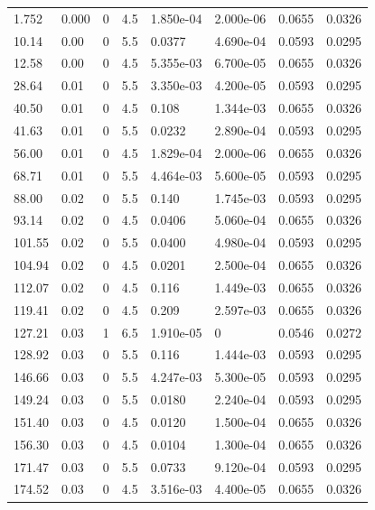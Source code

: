 \documentclass[preview]{standalone}
\begin{document}
{{\begin{tabular}{L{1.2cm}C{1.2cm} C{0.3cm}C{0.5cm} C{1.4cm}C{1.4cm} C{1.4cm}C{1.4cm}}
  1.752  &  0.000  & 0     & 4.5 &  1.850e-04  & 2.000e-06  & 0.0655 &  0.0326   \\ 
  10.14  &  0.00  & 0     & 5.5 &  0.0377  & 4.690e-04  & 0.0593 &  0.0295   \\ 
  12.58  &  0.00  & 0     & 4.5 &  5.355e-03  & 6.700e-05  & 0.0655 &  0.0326   \\ 
  28.64  &  0.01  & 0     & 5.5 &  3.350e-03  & 4.200e-05  & 0.0593 &  0.0295   \\ 
  40.50  &  0.01  & 0     & 4.5 &  0.108  & 1.344e-03  & 0.0655 &  0.0326   \\ 
  41.63  &  0.01  & 0     & 5.5 &  0.0232  & 2.890e-04  & 0.0593 &  0.0295   \\ 
  56.00  &  0.01  & 0     & 4.5 &  1.829e-04  & 2.000e-06  & 0.0655 &  0.0326   \\ 
  68.71  &  0.01  & 0     & 5.5 &  4.464e-03  & 5.600e-05  & 0.0593 &  0.0295   \\ 
  88.00  &  0.02  & 0     & 5.5 &  0.140  & 1.745e-03  & 0.0593 &  0.0295   \\ 
  93.14  &  0.02  & 0     & 4.5 &  0.0406  & 5.060e-04  & 0.0655 &  0.0326   \\ 
  101.55  &  0.02  & 0     & 5.5 &  0.0400  & 4.980e-04  & 0.0593 &  0.0295   \\ 
  104.94  &  0.02  & 0     & 4.5 &  0.0201  & 2.500e-04  & 0.0655 &  0.0326   \\ 
  112.07  &  0.02  & 0     & 4.5 &  0.116  & 1.449e-03  & 0.0655 &  0.0326   \\ 
  119.41  &  0.02  & 0     & 4.5 &  0.209  & 2.597e-03  & 0.0655 &  0.0326   \\ 
  127.21  &  0.03  & 1     & 6.5 &  1.910e-05  & 0  & 0.0546 &  0.0272   \\ 
  128.92  &  0.03  & 0     & 5.5 &  0.116  & 1.444e-03  & 0.0593 &  0.0295   \\ 
  146.66  &  0.03  & 0     & 5.5 &  4.247e-03  & 5.300e-05  & 0.0593 &  0.0295   \\ 
  149.24  &  0.03  & 0     & 5.5 &  0.0180  & 2.240e-04  & 0.0593 &  0.0295   \\ 
  151.40  &  0.03  & 0     & 4.5 &  0.0120  & 1.500e-04  & 0.0655 &  0.0326   \\ 
  156.30  &  0.03  & 0     & 4.5 &  0.0104  & 1.300e-04  & 0.0655 &  0.0326   \\ 
  171.47  &  0.03  & 0     & 5.5 &  0.0733  & 9.120e-04  & 0.0593 &  0.0295   \\ 
  174.52  &  0.03  & 0     & 4.5 &  3.516e-03  & 4.400e-05  & 0.0655 &  0.0326   \\ 

\end{tabular}}}
\end{document}

